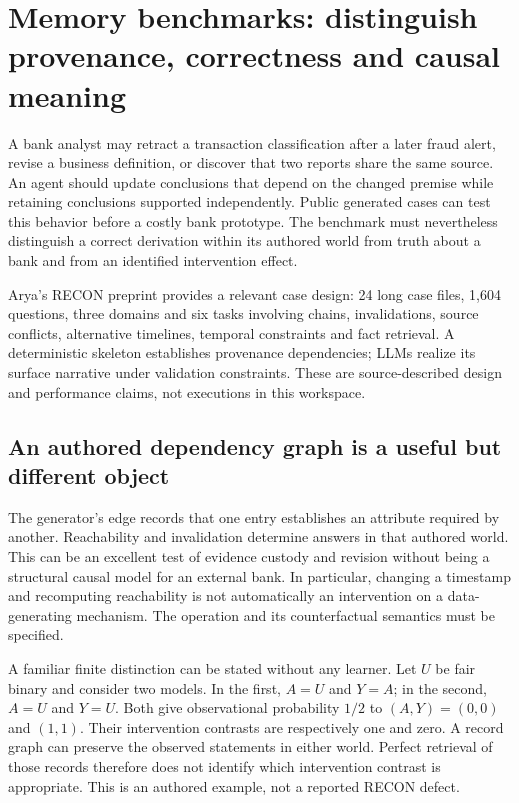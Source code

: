 
\section{Memory benchmarks: distinguish provenance, correctness and causal meaning}
\label{sec:exec23-recon-review}
A bank analyst may retract a transaction classification after a later fraud
alert, revise a business definition, or discover that two reports share the
same source. An agent should update conclusions that depend on the changed
premise while retaining conclusions supported independently. Public generated
cases can test this behavior before a costly bank prototype. The benchmark
must nevertheless distinguish a correct derivation within its authored world
from truth about a bank and from an identified intervention effect.

Arya's RECON preprint provides a relevant case design: 24 long case files,
1,604 questions, three domains and six tasks involving chains, invalidations,
source conflicts, alternative timelines, temporal constraints and fact
retrieval. A deterministic skeleton establishes provenance dependencies;
LLMs realize its surface narrative under validation constraints. These are
source-described design and performance claims, not executions in this
workspace. \citep{exec23_recon_original}

\subsection{An authored dependency graph is a useful but different object}
The generator's edge records that one entry establishes an attribute required
by another. Reachability and invalidation determine answers in that authored
world. This can be an excellent test of evidence custody and revision without
being a structural causal model for an external bank. In particular, changing
a timestamp and recomputing reachability is not automatically an intervention
on a data-generating mechanism. The operation and its counterfactual semantics
must be specified. \citep{exec23_recon_original}

A familiar finite distinction can be stated without any learner. Let $U$ be
fair binary and consider two models. In the first, $A=U$ and $Y=A$; in the
second, $A=U$ and $Y=U$. Both give observational probability $1/2$ to
$(A,Y)=(0,0)$ and $(1,1)$. Their intervention contrasts are respectively one
and zero. A record graph can preserve the observed statements in either
world. Perfect retrieval of those records therefore does not identify which
intervention contrast is appropriate. This is an authored example, not a
reported RECON defect. \citep{exec23_recon_reference}

